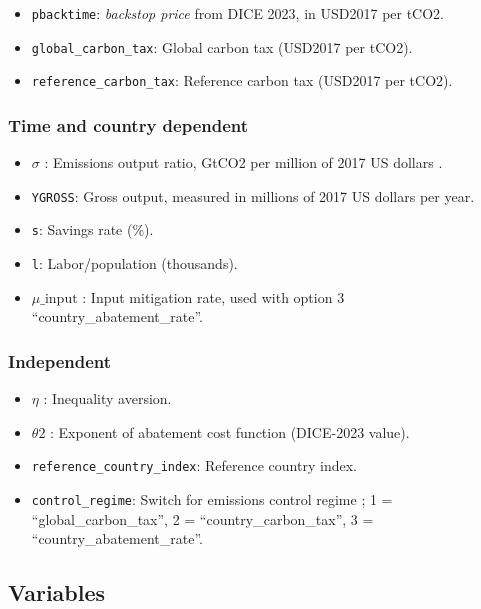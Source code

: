 \documentclass[
]{article}
\providecommand{\tightlist}{%
  \setlength{\itemsep}{0pt}\setlength{\parskip}{0pt}}
\begin{document}
\begin{itemize}
\tightlist
\item
  \texttt{pbacktime}: \emph{backstop price} from DICE 2023, in USD2017
  per tCO2.
\item
  \texttt{global\_carbon\_tax}: Global carbon tax (USD2017 per tCO2).
\item
  \texttt{reference\_carbon\_tax}: Reference carbon tax (USD2017 per tCO2).
\end{itemize}

\subsubsection{Time and country
dependent}\label{time-and-country-dependent}

\begin{itemize}
\tightlist
\item
  \(\sigma\) : Emissions output ratio, GtCO2 per million of 2017 US dollars .
\item
  \texttt{YGROSS}: Gross output, measured in millions of 2017 US dollars per year.
\item
  \texttt{s}: Savings rate (\%).
\item
  \texttt{l}: Labor/population (thousands).
\item
  \(\mu\_\text{input}\) : Input mitigation rate, used with option 3
  ``country\_abatement\_rate''.
\end{itemize}

\subsubsection{Independent}\label{independent}

\begin{itemize}
\tightlist
\item
  \(\eta\) : Inequality aversion.
\item
  \(\theta2\) : Exponent of abatement cost function (DICE-2023 value).
\item
  \texttt{reference\_country\_index}: Reference country index.
\item
  \texttt{control\_regime}: Switch for emissions control regime ; 1 =
  ``global\_carbon\_tax'', 2 = ``country\_carbon\_tax'', 3 =
  ``country\_abatement\_rate''.
\end{itemize}

\subsection{Variables}\label{variables}
\end{document}
